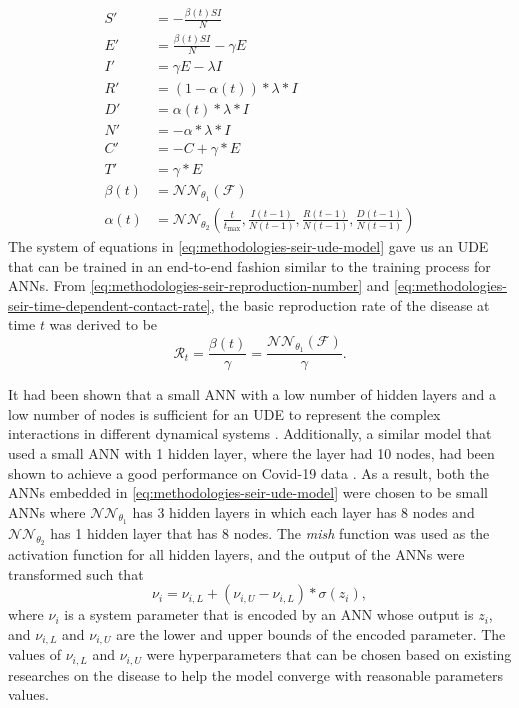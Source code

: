 \begin{equation}
    \begin{aligned}
        S' &= - \frac{\beta(t) SI}{N} \\
        E' &= \frac{\beta(t) SI}{N} - \gamma E \\
        I' &= \gamma E - \lambda I \\
        R' &= (1 - \alpha(t)) * \lambda * I \\
        D' &= \alpha(t) * \lambda * I \\
        N' &= - \alpha * \lambda * I \\
        C' &= -C + \gamma * E \\
        T' &= \gamma * E \\
        \beta(t) &= \mathcal{NN}_{\theta_1}(\mathcal{F}) \\
        \alpha(t) &= \mathcal{NN}_{\theta_2} (\frac{t}{t_\text{max}}, \frac{I(t-1)}{N(t-1)}, \frac{R(t-1)}{N(t-1)}, \frac{D(t-1)}{N(t-1)})
    \end{aligned}
    \label{eq:methodologies-seir-ude-model}
\end{equation}
The system of equations in \autoref{eq:methodologies-seir-ude-model} gave us an \gls{UDE} \cite{rackauckasUniversalDifferentialEquations2020} that can be trained in an end-to-end fashion similar to the training process for \glspl{ANN}.
From \autoref{eq:methodologies-seir-reproduction-number} and \autoref{eq:methodologies-seir-time-dependent-contact-rate}, the basic reproduction rate of the disease at time $t$ was derived to be
\begin{equation}
    \mathcal{R}_t = \frac{\beta(t)}{\gamma} = \frac{\mathcal{NN}_{\theta_1}(\mathcal{F})}{\gamma}.
\end{equation}

It had been shown that a small \gls{ANN} with a low number of hidden layers and a low number of nodes is sufficient for an \gls{UDE} to represent the complex interactions in different dynamical systems \cite{rackauckasUniversalDifferentialEquations2020}.
Additionally, a similar model that used a small \gls{ANN} with 1 hidden layer, where the layer had 10 nodes, had been shown to achieve a good performance on Covid-19 data \cite{dandekarMachineLearningAidedGlobal2020a}.
As a result, both the \glspl{ANN} embedded in \autoref{eq:methodologies-seir-ude-model} were chosen to be small \glspl{ANN} where $\mathcal{NN}_{\theta_1}$ has 3 hidden layers in which each layer has 8 nodes and $\mathcal{NN}_{\theta_2}$ has 1 hidden layer that has 8 nodes.
The \textit{mish} function \cite{misraMishSelfRegularized2020} was used as the activation function for all hidden layers, and the output of the \glspl{ANN} were transformed such that
\begin{equation}
    \nu_i = \nu_{i,L} + (\nu_{i,U} - \nu_{i,L}) * \sigma (z_i),
\end{equation}
where $\nu_i$ is a system parameter that is encoded by an \gls{ANN} whose output is $z_i$, and $\nu_{i,L}$ and $\nu_{i,U}$ are the lower and upper bounds of the encoded parameter.
The values of $\nu_{i,L}$ and $\nu_{i,U}$ were hyperparameters that can be chosen based on existing researches on the disease to help the model converge with reasonable parameters values.

